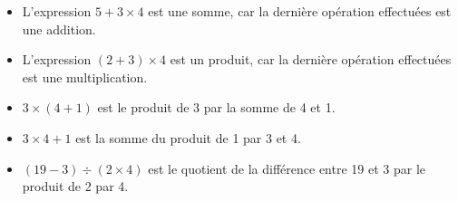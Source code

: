 \documentclass[xcolor={dvipsnames}]{beamer}
\begin{document}
\begin{frame}
	\begin{myexs}
		\begin{itemize}
			\item L'expression $5 + 3 \times 4$ est \pause une somme, car la dernière opération effectuées est une addition.\pause
			
			\item L'expression $(2 + 3 ) \times 4$ est \pause un produit, car la dernière opération effectuées est une multiplication.\pause
			
			\item $ 3 \times (4 + 1)$ est \pause le produit de 3 par la somme de 4 et 1.\pause
			
			\item $ 3 \times 4 + 1$ est \pause la somme du produit de 1 par 3 et  4.\pause
			
			\item $(19 - 3) \div (2 \times 4)$ est \pause le quotient de la différence entre  19 et 3 par le produit de 2 par 4.
		\end{itemize}
	\end{myexs}
\end{frame}
\end{document}
